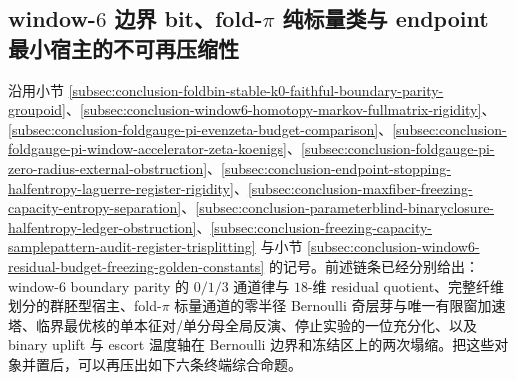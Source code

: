 \subsection{window-\texorpdfstring{$6$}{6} 边界 bit、fold-\texorpdfstring{$\pi$}{pi} 纯标量类与 endpoint 最小宿主的不可再压缩性}\label{subsec:conclusion-window6-foldpi-endpoint-binaryescort-minimal-hosts}

沿用小节 \ref{subsec:conclusion-foldbin-stable-k0-faithful-boundary-parity-groupoid}、\ref{subsec:conclusion-window6-homotopy-markov-fullmatrix-rigidity}、\ref{subsec:conclusion-foldgauge-pi-evenzeta-budget-comparison}、\ref{subsec:conclusion-foldgauge-pi-window-accelerator-zeta-koenigs}、\ref{subsec:conclusion-foldgauge-pi-zero-radius-external-obstruction}、\ref{subsec:conclusion-endpoint-stopping-halfentropy-laguerre-register-rigidity}、\ref{subsec:conclusion-maxfiber-freezing-capacity-entropy-separation}、\ref{subsec:conclusion-parameterblind-binaryclosure-halfentropy-ledger-obstruction}、\ref{subsec:conclusion-freezing-capacity-samplepattern-audit-register-trisplitting} 与小节 \ref{subsec:conclusion-window6-residual-budget-freezing-golden-constants} 的记号。前述链条已经分别给出：window-\(6\) boundary parity 的 \(0/1/3\) 通道律与 \(18\)-维 residual quotient、完整纤维划分的群胚型宿主、fold-\(\pi\) 标量通道的零半径 Bernoulli 奇层芽与唯一有限窗加速塔、临界最优核的单本征对/单分母全局反演、停止实验的一位充分化、以及 binary uplift 与 escort 温度轴在 Bernoulli 边界和冻结区上的两次塌缩。把这些对象并置后，可以再压出如下六条终端综合命题。

